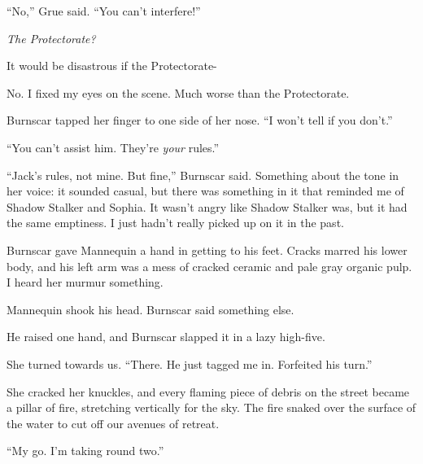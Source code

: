 ``No,'' Grue said.  ``You can't interfere!''



\emph{The Protectorate?}



It would be disastrous if the Protectorate-



No.  I fixed my eyes on the scene.  Much worse than the Protectorate.



Burnscar tapped her finger to one side of her nose.  ``I won't tell if you don't.''



``You can't assist him.  They're \emph{your} rules.''



``Jack's rules, not mine.  But fine,'' Burnscar said.  Something about the tone in her voice: it sounded casual, but there was something in it that reminded me of Shadow Stalker and Sophia.  It wasn't angry like Shadow Stalker was, but it had the same emptiness.  I just hadn't really picked up on it in the past.



Burnscar gave Mannequin a hand in getting to his feet.  Cracks marred his lower body, and his left arm was a mess of cracked ceramic and pale gray organic pulp.  I heard her murmur something.



Mannequin shook his head.  Burnscar said something else.



He raised one hand, and Burnscar slapped it in a lazy high-five.



She turned towards us.  ``There.  He just tagged me in.  Forfeited his turn.''



She cracked her knuckles, and every flaming piece of debris on the street became a pillar of fire, stretching vertically for the sky.  The fire snaked over the surface of the water to cut off our avenues of retreat.



``My go.  I'm taking round two.''





